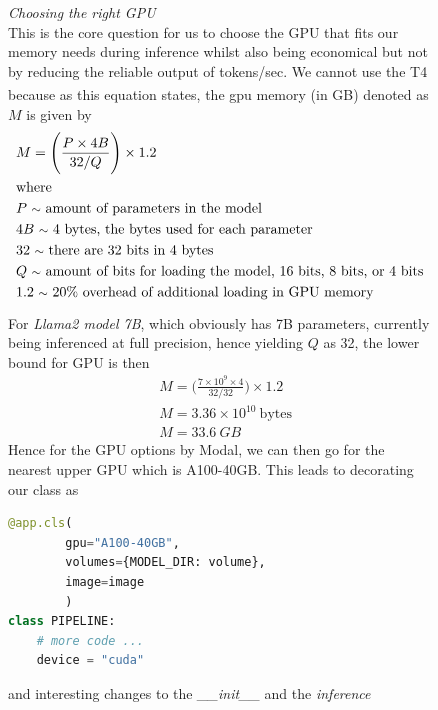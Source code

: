 \documentclass[12pt]{article}
\newcommand{\customtext}[3]{%
    \vspace{#2} %
    \fontsize{13}{8}\textcolor{#1}{\textit{#3}}%
}
\newcommand{\sidecite}[1]{\textsuperscript{\textcolor{blue}{\textbf{\scriptsize#1}}}}
\newcommand{\maincitecount}{\sidecite{\stepcounter{maincite}\themaincite}}
\begin{document}
\pagebreak
\begin{figure}[!htb]
    \begin{minipage}[t]{0.65\textwidth}
    \raggedright
    \customtext{xtitle}{0em}{Choosing the right GPU}\\
This is the core question for us to choose the GPU that fits our memory needs during inference whilst also 
being economical but not by reducing the reliable output of tokens/sec. We cannot use the T4 because as this 
equation states{\maincitecount}, the gpu memory (in GB) denoted as $M$ is given by 
\begin{align*}
    & M = \Bigg(\frac{P\times4B}{32/Q}\Bigg)\times1.2\\
    & \text{where}\\
    & P\ \text{\footnotesize $\sim$}\ \text{amount of parameters in the model}\\
    & 4B\ \text{\footnotesize $\sim$}\ \text{4 bytes, the bytes used for each parameter}\\
    & 32\ \text{\footnotesize $\sim$}\ \text{there are 32 bits in 4 bytes}\\
    & Q\ \text{\footnotesize $\sim$}\ \text{amount of bits for loading the model, 16 bits, 8 bits, or 4 bits}\\
    & 1.2\ \text{\footnotesize $\sim$}\ \text{20\% overhead of additional loading in GPU memory}
\end{align*}
For {\it Llama2 model 7B}, which obviously has 7B{\maincitecount} parameters, currently being inferenced at full precision, 
hence yielding $Q$ as 32, the lower bound for GPU is then 
\begin{align*}
    &M=\Bigg(\frac{7\times10^9\times4}{32/32}\Bigg)\times1.2\\
    &M = 3.36\times10^{10}\ \text{bytes}\\
    &M = 33.6\ GB
\end{align*}
Hence for the GPU options by Modal, we can then go for the nearest upper GPU which is A100-40GB. This leads to 
decorating our class as 
\begin{lstlisting}[language=python,style=python,basicstyle=\ttfamily\footnotesize]
@app.cls(
        gpu="A100-40GB", 
        volumes={MODEL_DIR: volume}, 
        image=image
        )
class PIPELINE:
    # more code ...
    device = "cuda"
\end{lstlisting}
and interesting changes to the {\it \footnotesize \_\_init\_\_} and the {\it \footnotesize inference} 

\end{minipage}
\end{figure}
\end{document}
